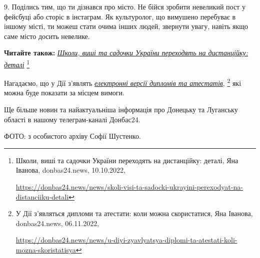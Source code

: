 9. Поділись тим, що ти дізнався про місто. Не бійся зробити невеликий пост у
фейсбуці або сторіс в інстаграм. Як культуролог, що вимушено перебуває в іншому
місті, ти можеш стати очима інших людей, звернути увагу, навіть якщо саме місто
досить невелике.

\textbf{Читайте також:} \href{https://donbas24.news/news/skoli-visi-ta-sadocki-ukrayini-perexodyat-na-distanciiku-detali}{\emph{Школи, виші та садочки України переходять на дистанційку: деталі}}%
\footnote{Школи, виші та садочки України переходять на дистанційку: деталі, Яна Іванова, donbas24.news, 10.10.2022, \par%
\url{https://donbas24.news/news/skoli-visi-ta-sadocki-ukrayini-perexodyat-na-distanciiku-detali}%
}

Нагадаємо, що у Дії з'являть \href{https://donbas24.news/news/u-diyi-zyavlyatsya-diplomi-ta-atestati-koli-mozna-skoristatisya}{\emph{електронні версії дипломів та атестатів}},%
\footnote{У Дії з'являться дипломи та атестати: коли можна скористатися, Яна Іванова, donbas24.news, 06.11.2022, \par\url{https://donbas24.news/news/u-diyi-zyavlyatsya-diplomi-ta-atestati-koli-mozna-skoristatisya}} які можна буде показати за місцем вимоги.

Ще більше новин та найактуальніша інформація про Донецьку та Луганську області
в нашому телеграм-каналі Донбас24.

ФОТО: з особистого архіву Софії Шустенко.


